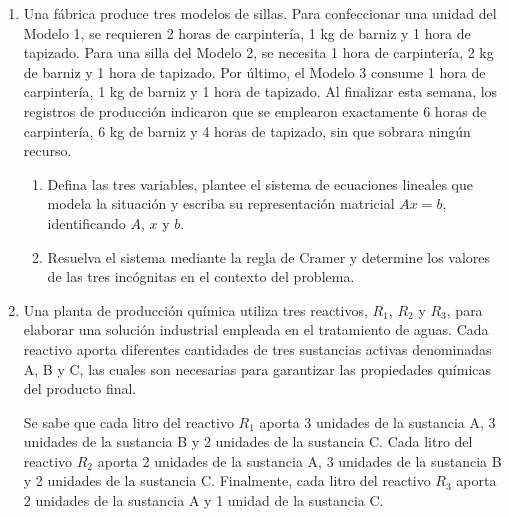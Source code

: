 \documentclass[11pt,a4paper]{article}
\begin{document}
\begin{enumerate}
\begin{enumerate}
\item Defina las tres variables, plantee el sistema de ecuaciones
lineales que modela la situación y escriba su representación
matricial $Ax=b$, identificando $A$, $x$ y $b$.

\item Resuelva el sistema mediante la regla de Cramer y determine los valores de las tres incógnitas
en el contexto del problema.
\end{enumerate}

\item Una fábrica produce tres modelos de sillas.
Para confeccionar una unidad del Modelo 1, se requieren
2 horas de carpintería, 1 kg de barniz y 1 hora de tapizado.
Para una silla del Modelo 2, se necesita 1 hora de carpintería,
2 kg de barniz y 1 hora de tapizado.
Por último, el Modelo 3 consume 1 hora de carpintería,
1 kg de barniz y 1 hora de tapizado. Al finalizar esta semana, los registros de producción indicaron que se emplearon exactamente 6 horas de carpintería,
6 kg de barniz y 4 horas de tapizado, sin que sobrara
ningún recurso.




\begin{enumerate}
\item Defina las tres variables, plantee el sistema de ecuaciones lineales que modela la situación y escriba su representación matricial $Ax=b$, identificando $A$, $x$ y $b$.
\item Resuelva el sistema mediante la regla de Cramer  y determine los valores de las tres incógnitas en el contexto del problema.
\end{enumerate}


\item Una planta de producción química utiliza tres reactivos,
$R_1$, $R_2$ y $R_3$, para elaborar una solución industrial
empleada en el tratamiento de aguas. Cada reactivo aporta
diferentes cantidades de tres sustancias activas denominadas
A, B y C, las cuales son necesarias para garantizar las
propiedades químicas del producto final.

Se sabe que cada litro del reactivo $R_1$ aporta
3 unidades de la sustancia A, 3 unidades de la sustancia B
y 2 unidades de la sustancia C.
Cada litro del reactivo $R_2$ aporta 2 unidades de la sustancia A,
3 unidades de la sustancia B y 2 unidades de la sustancia C.
Finalmente, cada litro del reactivo $R_3$ aporta
2 unidades de la sustancia A y 1 unidad de la sustancia C.


\end{enumerate}
\end{document}
